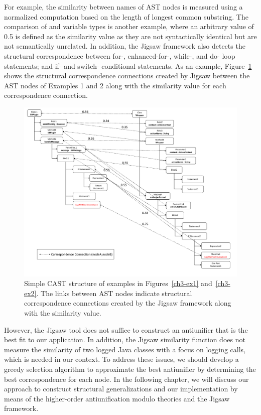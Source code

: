 For example, the similarity between names of AST nodes is measured using a normalized computation based on the length of longest common substring. The comparison of  and  variable types is another example, where an arbitrary value of 0.5 is defined as the similarity value as they are not syntactically identical but are not semantically unrelated. In addition, the Jigsaw framework also detects the structural correspondence between  for-, enhanced-for-, while-, and do- loop statements; and if- and switch- conditional statements. As an example, Figure~\ref{fig:meth-ast-1} shows the structural correspondence connections created by Jigsaw between the AST nodes of Examples 1 and 2 along with the similarity value for each correspondence connection.

\begin{figure} [H]
  \centering\includegraphics [width = \textwidth]{Drawing4/FirstCorr.pdf}
  \caption{Simple CAST structure of examples in Figures~\ref{ch3-ex1} and~\ref{ch3-ex2}. The links between AST nodes indicate structural correspondence connections created by the Jigsaw framework along with the similarity value.}
  \label{fig:meth-ast-1}
\end{figure}

However, the Jigsaw tool does not suffice to construct an antiunifier that is the best fit to our application. In addition, the Jigsaw similarity function does not measure the similarity of two logged Java classes with a focus on logging calls, which is needed in our context. To address these issues, we should develop a greedy selection algorithm to approximate the best antiunifier by determining the best correspondence for each node. In the following chapter, we will discuss our approach to construct structural generalizations and our implementation by means of the higher-order antiunification modulo theories and the Jigsaw framework.

